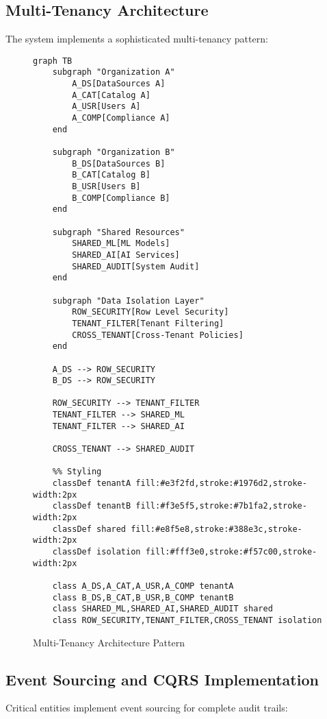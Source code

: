 \documentclass[12pt,a4paper]{article}
\begin{document}
\subsection{Multi-Tenancy Architecture}

The system implements a sophisticated multi-tenancy pattern:

\begin{figure}[H]
\centering
\begin{verbatim}
graph TB
    subgraph "Organization A"
        A_DS[DataSources A]
        A_CAT[Catalog A]
        A_USR[Users A]
        A_COMP[Compliance A]
    end
    
    subgraph "Organization B"
        B_DS[DataSources B]
        B_CAT[Catalog B]
        B_USR[Users B]
        B_COMP[Compliance B]
    end
    
    subgraph "Shared Resources"
        SHARED_ML[ML Models]
        SHARED_AI[AI Services]
        SHARED_AUDIT[System Audit]
    end
    
    subgraph "Data Isolation Layer"
        ROW_SECURITY[Row Level Security]
        TENANT_FILTER[Tenant Filtering]
        CROSS_TENANT[Cross-Tenant Policies]
    end
    
    A_DS --> ROW_SECURITY
    B_DS --> ROW_SECURITY
    
    ROW_SECURITY --> TENANT_FILTER
    TENANT_FILTER --> SHARED_ML
    TENANT_FILTER --> SHARED_AI
    
    CROSS_TENANT --> SHARED_AUDIT
    
    %% Styling
    classDef tenantA fill:#e3f2fd,stroke:#1976d2,stroke-width:2px
    classDef tenantB fill:#f3e5f5,stroke:#7b1fa2,stroke-width:2px
    classDef shared fill:#e8f5e8,stroke:#388e3c,stroke-width:2px
    classDef isolation fill:#fff3e0,stroke:#f57c00,stroke-width:2px
    
    class A_DS,A_CAT,A_USR,A_COMP tenantA
    class B_DS,B_CAT,B_USR,B_COMP tenantB
    class SHARED_ML,SHARED_AI,SHARED_AUDIT shared
    class ROW_SECURITY,TENANT_FILTER,CROSS_TENANT isolation
\end{verbatim}
\caption{Multi-Tenancy Architecture Pattern}
\end{figure}

\subsection{Event Sourcing and CQRS Implementation}

Critical entities implement event sourcing for complete audit trails:
\end{document}
